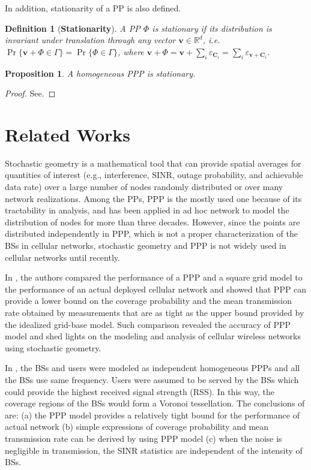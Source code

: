 \documentclass[a4paper,twocolumn]{IEEEtran}
\newtheorem{definition}{\textbf{Definition}}
\newtheorem{proposition}{\textbf{Proposition}}
\begin{document}
In addition, stationarity of a PP is also defined.
\begin{definition}[\textbf{Stationarity}]
A PP $\Phi$ is stationary if its distribution is invariant under translation through any vector $\bm{v}\in\mathbb{R}^d$, i.e. $\Pr\{\bm{v}+\Phi \in \Gamma\}=\Pr\{\Phi \in \Gamma\}$, where $\bm{v}+\Phi=\bm{v}+\sum_i \varepsilon_{\bm{C}_i} = \sum_i \varepsilon_{\bm{v}+\bm{C}_i}$.
\end{definition}
\begin{proposition}
A homogeneous PPP is stationary.
\end{proposition}
\begin{proof}
See.
\end{proof}

\section{Related Works}\label{Sec:Rel}
Stochastic geometry is a mathematical tool that can provide spatial averages for quantities of interest (e.g., interference, SINR, outage probability, and achievable data rate) over a large number of nodes randomly distributed or over many network realizations\cite{Haenggi2009JSAC}. Among the PPs, PPP is the mostly used one because of its tractability in analysis, and has been applied in ad hoc network to model the distribution of nodes for more than three decades\cite{Kleinrock1978}. However, since the points are distributed independently in PPP, which is not a proper characterization of the BSs in cellular networks, stochastic geometry and PPP is not widely used in cellular networks until recently.     

In \cite{Andrews2011TC}, the authors compared the performance of a PPP and a square grid model to the performance of an actual deployed cellular network and showed that PPP can provide a lower bound on the coverage probability and the mean transmission rate obtained by measurements that are as tight as the upper bound provided by the idealized grid-base model. Such comparison revealed the accuracy of PPP model and shed lights on the modeling and analysis of cellular wireless networks using stochastic geometry.

In \cite{Andrews2011TC}, the BSs and users were modeled as independent homogeneous PPPs and all the BSs use same frequency. Users were assumed to be served by the BSs which could provide the highest received signal strength (RSS). In this way, the coverage regions of the BSs would form a Voronoi tessellation\cite{Okabe1992}. The conclusions of \cite{Andrews2011TC} are: (a) the PPP model provides a relatively tight bound for the performance of actual network (b) simple expressions of coverage probability and mean transmission rate can be derived by using PPP model (c) when the noise is negligible in transmission, the SINR statistics are independent of the intensity of BSs.
\end{document}
